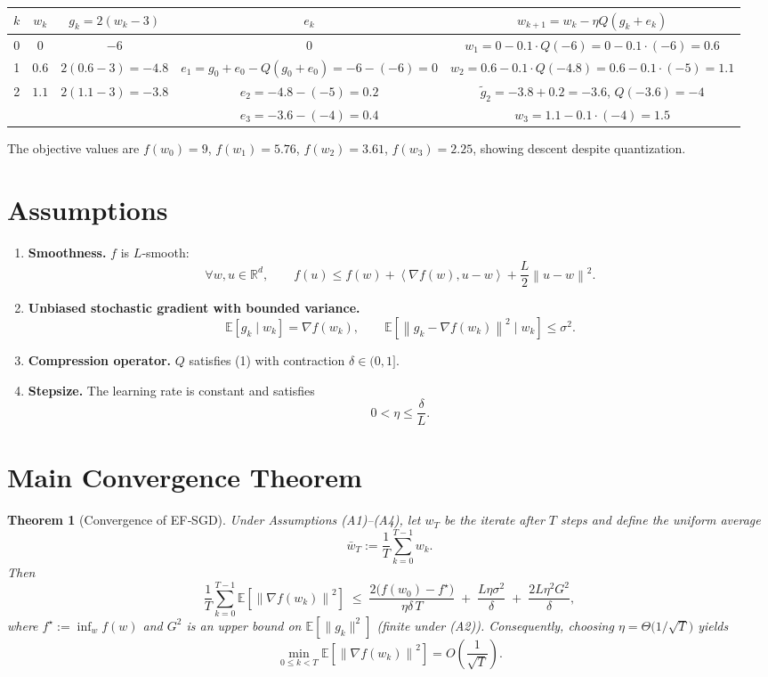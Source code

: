 \documentclass{article}
\newtheorem{theorem}{Theorem}
\newcommand{\E}{\mathbb{E}}
\newcommand{\norm}[1]{\left\|#1\right\|}
\newcommand{\inner}[2]{\left\langle #1,#2\right\rangle}
\begin{document}
\begin{center}
\begin{tabular}{c|c|c|c|c}
$k$ & $w_k$ & $g_k=2(w_k-3)$ & $e_k$ & $w_{k+1}=w_k-\eta Q(g_k+e_k)$ \\ \hline
0 & $0$ & $-6$ & $0$ & $w_1=0-0.1\cdot Q(-6)=0-0.1\cdot(-6)=0.6$\\
1 & $0.6$ & $2(0.6-3)=-4.8$ & $e_1=g_0+e_0-Q(g_0+e_0)= -6-(-6)=0$ & $w_2=0.6-0.1\cdot Q(-4.8)=0.6-0.1\cdot(-5)=1.1$\\
2 & $1.1$ & $2(1.1-3)=-3.8$ & $e_2= -4.8-(-5)=0.2$ & $\tilde g_2=-3.8+0.2=-3.6$, $Q(-3.6)=-4$\\
  &   &   & $e_3=-3.6-(-4)=0.4$ & $w_3=1.1-0.1\cdot(-4)=1.5$
\end{tabular}
\end{center}

The objective values are $f(w_0)=9$, $f(w_1)=5.76$, $f(w_2)=3.61$, $f(w_3)=2.25$, showing descent despite quantization.

\newpage

\section*{Assumptions}
\begin{enumerate}
\item \textbf{Smoothness.} $f$ is $L$‑smooth:
\[
\forall w,u\in\mathbb{R}^d,\qquad
f(u)\le f(w)+\inner{\nabla f(w)}{u-w}+\frac{L}{2}\norm{u-w}^2 .
\tag{A1}
\]
\item \textbf{Unbiased stochastic gradient with bounded variance.}
\[
\E[g_k\mid w_k]=\nabla f(w_k),\qquad 
\E\!\left[\norm{g_k-\nabla f(w_k)}^2\mid w_k\right]\le\sigma^2 .
\tag{A2}
\]
\item \textbf{Compression operator.} $Q$ satisfies (1) with contraction $\delta\in(0,1]$.
\item \textbf{Stepsize.} The learning rate is constant and satisfies
\[
0<\eta\le\frac{\delta}{L}.
\tag{A4}
\]
\end{enumerate}

\section*{Main Convergence Theorem}
\begin{theorem}[Convergence of EF‑SGD]\label{thm:efsgd}
Under Assumptions (A1)–(A4), let $w_T$ be the iterate after $T$ steps and define the uniform average 
\[
\bar w_T:=\frac1T\sum_{k=0}^{T-1}w_k .
\]
Then
\[
\frac1T\sum_{k=0}^{T-1}\E\!\left[\norm{\nabla f(w_k)}^2\right]
\;\le\;
\frac{2\bigl(f(w_0)-f^\star\bigr)}{\eta\delta\,T}
\;+\;
\frac{L\eta\sigma^2}{\delta}
\;+\;
\frac{2L\eta^2 G^2}{\delta},
\tag{3}
\]
where $f^\star:=\inf_w f(w)$ and $G^2$ is an upper bound on $\E[\|g_k\|^2]$ (finite under (A2)).  
Consequently, choosing $\eta = \Theta\!\bigl(1/\sqrt{T}\bigr)$ yields
\[
\min_{0\le k<T}\E\!\left[\norm{\nabla f(w_k)}^2\right]=O\!\left(\frac{1}{\sqrt{T}}\right).
\]
\end{theorem}
\end{document}

